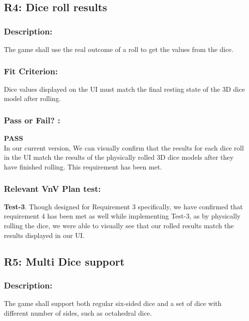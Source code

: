 \documentclass[12pt, titlepage]{article}
\begin{document}
\subsection{R4: Dice roll results} 
\label{R4} 

\subsubsection*{Description:}The game shall use the real outcome of a roll to get the values from the dice.
  
\subsubsection*{Fit Criterion:} Dice values displayed on the UI must match the final resting state of the 3D dice model after rolling.

\subsubsection*{Pass or Fail? :} 
 
  \noindent \textbf{PASS}\\
 
 In our current version, We can visually confirm that the results for each dice roll in the UI match the results of the physically rolled 3D dice models after they have finished rolling. This requirement has been met.
 
  \subsubsection*{Relevant VnV Plan test: } \textbf{ Test-3}. Though designed for Requirement 3 specifically, we have confirmed that requirement 4 has been met as well while implementing Test-3, as by physically rolling the dice, we were able to visually see that our rolled results match the results displayed in our UI.
  
  
\subsection{R5: Multi Dice support} 
\label{R5} 

\subsubsection*{Description:}The game shall support both regular six-sided dice and a set of dice with different number of sides, such as octahedral dice.
\end{document}
